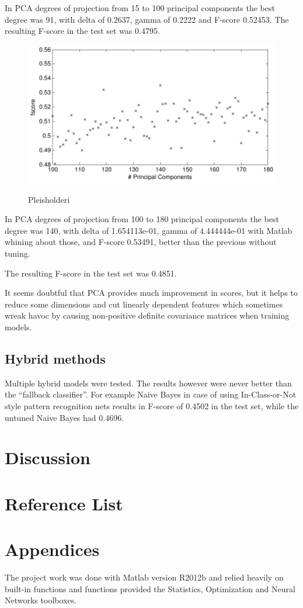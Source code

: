 \documentclass[a4paper,10pt]{article}
\begin{document}
In PCA degrees of projection from 15 to 100 principal components the best degree was 91, with delta of 0.2637, gamma of 0.2222 and F-score 0.52453. The resulting F-score in the test set was 0.4795.

\begin{figure}
\begin{center}
	\caption{Pleisholderi}
	{\includegraphics[scale=0.5,angle=0]{./img/bayes_gamma_pca2.pdf}}
	\label{fig:BayesGamma21}
\end{center}
\end{figure}

In PCA degrees of projection from 100 to 180 principal components the best degree was 140, with delta of 1.654113e-01, gamma of 4.444444e-01 with Matlab whining about those, and F-score 0.53491, better than the previous without tuning.

The resulting F-score in the test set was 0.4851.

It seems doubtful that PCA provides much improvement in scores, but it helps to reduce some dimensions and cut linearly dependent features which sometimes wreak havoc by causing non-positive definite covariance matrices when training models.

\subsection{Hybrid methods}

Multiple hybrid models were tested. The results however were never better than the “fallback classifier”. For example Naive Bayes in case of using In-Class-or-Not style pattern recognition nets results in F-score of 0.4502 in the test set, while the untuned Naive Bayes had 0.4696. 

\section{Discussion}
\section{Reference List}



\section{Appendices}

The project work was done with Matlab version R2012b and relied heavily on built-in functions and functions provided the Statistics, Optimization and Neural Networks toolboxes.
\end{document}
